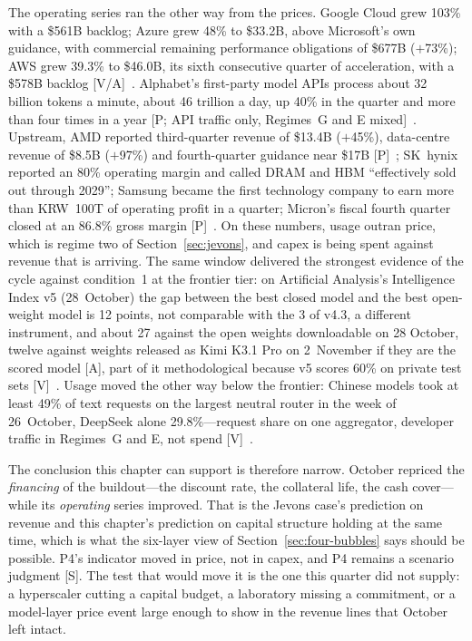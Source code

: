 The operating series ran the other way from the prices. Google Cloud grew 103\% with a \$561B backlog; Azure grew 48\% to \$33.2B, above Microsoft's own guidance, with commercial remaining performance obligations of \$677B ($+$73\%); AWS grew 39.3\% to \$46.0B, its sixth consecutive quarter of acceleration, with a \$578B backlog [V/A]~\cite{cap-alphabet-q3,cap-msft-fq1,cap-amazon-q3}. Alphabet's first-party model APIs process about 32 billion tokens a minute, about 46 trillion a day, up 40\% in the quarter and more than four times in a year [P; API traffic only, Regimes~G and E mixed]~\cite{cap-alphabet-q3}. Upstream, AMD reported third-quarter revenue of \$13.4B ($+$45\%), data-centre revenue of \$8.5B ($+$97\%) and fourth-quarter guidance near \$17B [P]~\cite{cap-amd-q3}; SK~hynix reported an 80\% operating margin and called DRAM and HBM ``effectively sold out through 2029''; Samsung became the first technology company to earn more than KRW~100T of operating profit in a quarter; Micron's fiscal fourth quarter closed at an 86.8\% gross margin [P]~\cite{cap-memory-q3}. On these numbers, usage outran price, which is regime two of Section~\ref{sec:jevons}, and capex is being spent against revenue that is arriving. The same window delivered the strongest evidence of the cycle against condition~1 at the frontier tier: on Artificial Analysis's Intelligence Index v5 (28~October) the gap between the best closed model and the best open-weight model is 12 points, not comparable with the 3 of v4.3, a different instrument, and about 27 against the open weights downloadable on 28 October, twelve against weights released as Kimi K3.1 Pro on 2~November if they are the scored model [A], part of it methodological because v5 scores 60\% on private test sets [V]~\cite{mdl-aa-v5}. Usage moved the other way below the frontier: Chinese models took at least 49\% of text requests on the largest neutral router in the week of 26~October, DeepSeek alone 29.8\%---request share on one aggregator, developer traffic in Regimes~G and E, not spend [V]~\cite{mdl-openrouter-oct26}.

The conclusion this chapter can support is therefore narrow. October repriced the \emph{financing} of the buildout---the discount rate, the collateral life, the cash cover---while its \emph{operating} series improved. That is the Jevons case's prediction on revenue and this chapter's prediction on capital structure holding at the same time, which is what the six-layer view of Section~\ref{sec:four-bubbles} says should be possible. P4's indicator moved in price, not in capex, and P4 remains a scenario judgment [S]. The test that would move it is the one this quarter did not supply: a hyperscaler cutting a capital budget, a laboratory missing a commitment, or a model-layer price event large enough to show in the revenue lines that October left intact.

